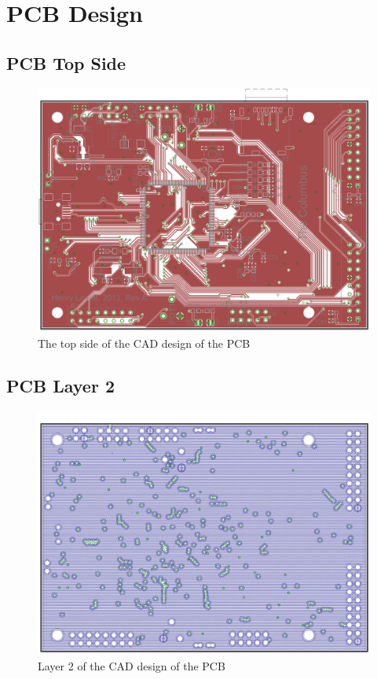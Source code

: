 \chapter{PCB Design} \label{Appendix:PCB}
\section{PCB Top Side}
\begin{figure}[ht!]
\centering
\includegraphics[angle=90,width=\textwidth,height=\textheight-5cm,keepaspectratio]{Figures/ColumbusPCBTop_GP.png} 
\caption{The top side of the CAD design of the PCB}
\label{fig:PCB:Eagle:Top}
\end{figure}
\clearpage
\section{PCB Layer 2}
\begin{figure}[ht!]
\centering
\includegraphics[angle=90,width=\textwidth,height=\textheight-5cm,keepaspectratio]{Figures/layer2.png} 
\caption{Layer 2 of the CAD design of the PCB}
\label{fig:PCB:Eagle:Bottom}
\end{figure}
\clearpage
